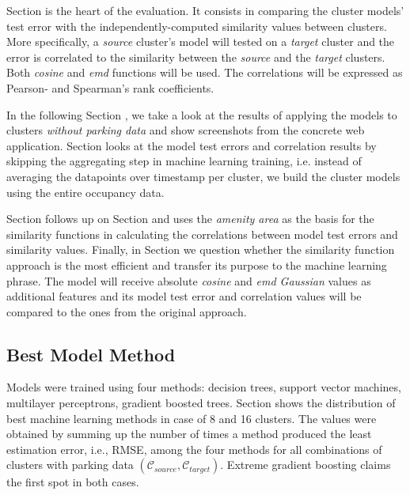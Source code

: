 Section  is the heart of the evaluation. It consists in comparing the cluster models' test error with the independently-computed similarity values between clusters. More specifically, a \textit{source} cluster's model will tested on a \textit{target} cluster and the error is correlated to the similarity between the \textit{source} and the \textit{target} clusters. Both \textit{cosine} and \textit{emd} functions will be used. The correlations will be expressed as Pearson- and Spearman's rank coefficients.

In the following Section , we take a look at the results of applying the models to clusters \textit{without parking data} and show screenshots from the concrete web application. Section  looks at the model test errors and correlation results by skipping the aggregating step in machine learning training, i.e. instead of averaging the datapoints over timestamp per cluster, we build the cluster models using the entire occupancy data. 

Section  follows up on Section  and uses the \textit{amenity area} as the basis for the similarity functions in calculating the correlations between model test errors and similarity values. Finally, in Section  we question whether the similarity function approach is the most efficient and transfer its purpose to the machine learning phrase. The model will receive absolute \textit{cosine} and \textit{emd Gaussian} values as additional features and its model test error and correlation values will be compared to the ones from the original approach.

\subsection{Best Model Method}
\label{evaluation:best_model}
Models were trained using four methods: decision trees, support vector machines, multilayer perceptrons, gradient boosted trees. Section  shows the distribution of best machine learning methods in case of 8 and 16 clusters.
The values were obtained by summing up the number of times a method produced the least estimation error, i.e., RMSE, among the four methods for all combinations of clusters with parking data $(\mathcal{C}_{source}, \mathcal{C}_{target})$.
Extreme gradient boosting claims the first spot in both cases.

